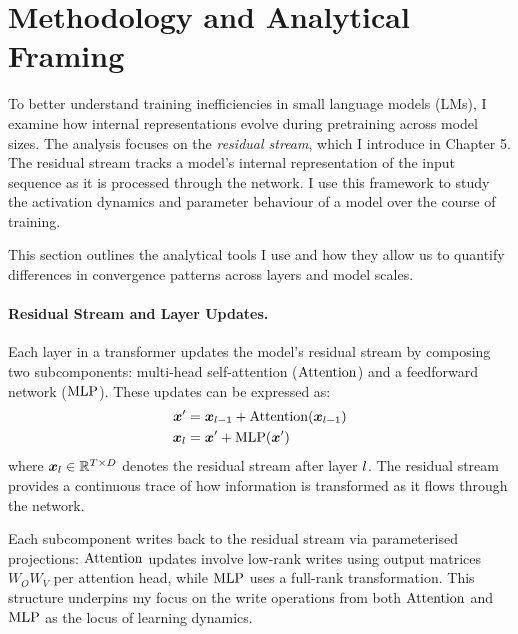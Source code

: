 \section{Methodology and Analytical Framing}
\label{sec:methodology}

To better understand training inefficiencies in small language models (LMs), I examine how internal representations evolve during pretraining across model sizes. The analysis focuses on the \textit{residual stream}, which I introduce in Chapter 5. The residual stream tracks a model's internal representation of the input sequence as it is processed through the network. I use this framework to study the activation dynamics and parameter behaviour of a model over the course of training.

This section outlines the analytical tools I use and how they allow us to quantify differences in convergence patterns across layers and model scales.

\paragraph{Residual Stream and Layer Updates.}
Each layer in a transformer updates the model's residual stream by composing two subcomponents: multi-head self-attention ($\mathrm{Attention}$) and a feedforward network ($\mathrm{MLP}$). These updates can be expressed as:
\begin{align}
    \boldsymbol{x}' &= \boldsymbol{x}_{l-1} + \mathrm{Attention}(\boldsymbol{x}_{l-1}) \\
    \boldsymbol{x}_{l} &= \boldsymbol{x}' + \mathrm{MLP}(\boldsymbol{x}')
\end{align}
where $\boldsymbol{x}_{l} \in \mathbb{R}^{T \times D}$ denotes the residual stream after layer $l$. The residual stream provides a continuous trace of how information is transformed as it flows through the network.

Each subcomponent writes back to the residual stream via parameterised projections: $\mathrm{Attention}$ updates involve low-rank writes using output matrices $W_O W_V$ per attention head, while $\mathrm{MLP}$ uses a full-rank transformation. This structure underpins my focus on the write operations from both $\mathrm{Attention}$ and $\mathrm{MLP}$ as the locus of learning dynamics.

